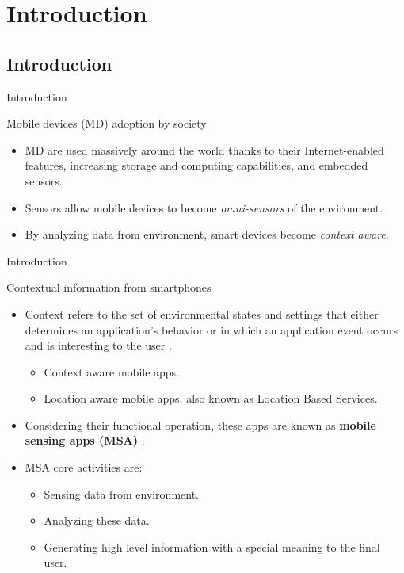 \section{Introduction}

\subsection{Introduction}

\begin{frame}{Introduction}
  \begin{block}{Mobile devices (MD) adoption by society}
    \begin{itemize}
      \item MD are used massively around the world \citep{Qureshi2014}  thanks to their Internet-enabled features, increasing storage and computing capabilities, and embedded sensors.
      \item Sensors allow mobile devices to become \emph{omni-sensors} of the environment.
      \item By analyzing data from environment, smart devices become \emph{context aware}.
    \end{itemize}
  \end{block}
\end{frame}

\begin{frame}{Introduction}
  \begin{block}{Contextual information from smartphones}
    \begin{itemize}
      \item Context refers to the set of environmental states and settings that either determines an application’s behavior or in which an application event occurs and is interesting to the user \citep{Chen2000}.
      \begin{itemize}
        \item Context aware mobile apps.
        \item Location aware mobile apps, also known as Location Based Services.
      \end{itemize}
      
      \item Considering their functional operation, these apps are known as \textbf{mobile sensing apps (MSA)} \citep{Lane2010,Campbell2012}.
      \item MSA core activities are:
      \begin{itemize}
         \item Sensing data from environment.
         \item Analyzing these data.
         \item Generating high level information with a special meaning to the final user.
       \end{itemize}
    \end{itemize}
  \end{block}
\end{frame}

